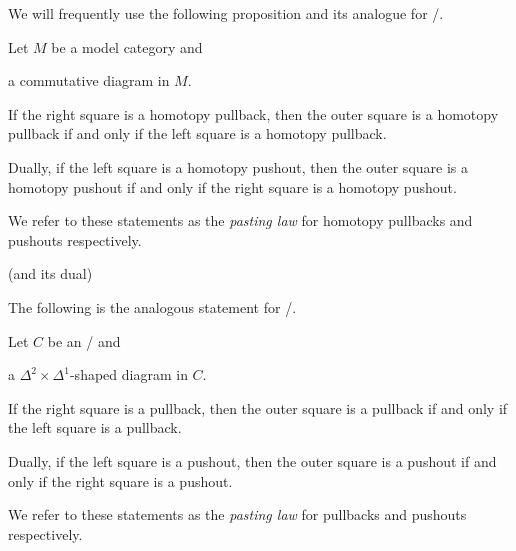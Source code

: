 We will frequently use the following proposition and its analogue for \inftycats/.
\begin{prop}\label{prop:pastingLaw}
    Let $M$ be a model category and 
    \begin{center}
    \end{center}
    a commutative diagram in $M$.

    If the right square is a homotopy pullback, then the outer square is a homotopy pullback if and only if the left square is a homotopy pullback.

    Dually, if the left square is a homotopy pushout, then the outer square is a homotopy pushout if and only if the right square is a homotopy pushout.

    We refer to these statements as the \emph{pasting law} for homotopy pullbacks and pushouts respectively.
    \begin{reference}
        \cite[Proposition 8]{models_of_htpy_limits} (and its dual)
    \end{reference}
\end{prop}
The following is the analogous statement for \inftycats/.
\begin{prop}
    Let $C$ be an \inftycat/ and 
    \begin{center}
    \end{center}
    a $\Delta^2\times\Delta^1$-shaped diagram in $C$.

    If the right square is a pullback, then the outer square is a pullback if and only if the left square is a pullback.

    Dually, if the left square is a pushout, then the outer square is a pushout if and only if the right square is a pushout.

    We refer to these statements as the \emph{pasting law} for pullbacks and pushouts respectively.
    \begin{reference}
        \cite[Proposition 7.6.3.16]{kerodon}
    \end{reference}
\end{prop}
